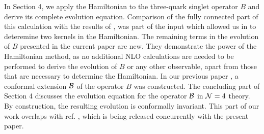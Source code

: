 \documentclass[11pt,a4paper]{article}
\begin{document}
In Section 4, we apply the Hamiltonian to the three-quark singlet operator $B$ and derive its complete evolution equation.  
Comparison of the fully connected part of this calculation with the results of \cite{Grab}, was part of the input which allowed us  in \cite{nlojimwlk} to deteremine two kernels in the Hamiltonian. The remaining terms in the evolution of $B$ presented in the current paper are new.  
They demonstrate the power of the Hamiltonian method, as no additional NLO calculations are needed to be performed to derive the evolution of $B$ or any other observable, apart from those that are necessary to determine the Hamiltonian.
In our previous paper \cite{KLMconf}, a conformal extension ${\cal B}$ of the operator $B$ was constructed. The concluding part  of Section 4  
discusses the evolution equation for the operator $\cal B$ in ${\cal N}=4$ theory. By construction, the resulting evolution is conformally invariant.
This part of our work overlaps with ref. \cite{BalGrab}, which is being released concurrently with the present paper.
\end{document}
